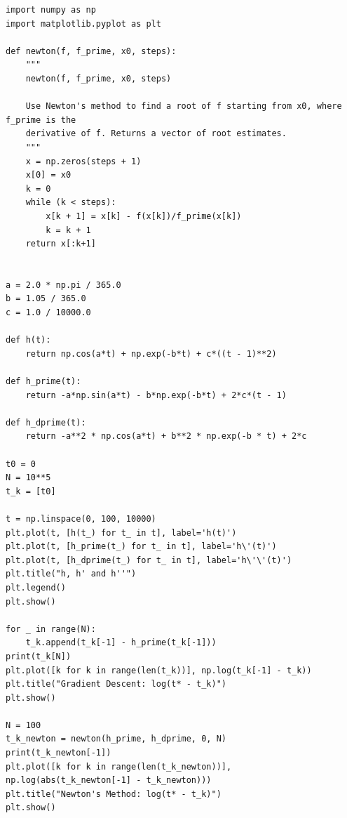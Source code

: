\documentclass[11pt]{article}
\begin{document}
\begin{lstlisting}
import numpy as np
import matplotlib.pyplot as plt

def newton(f, f_prime, x0, steps):
    """
    newton(f, f_prime, x0, steps)

    Use Newton's method to find a root of f starting from x0, where f_prime is the
    derivative of f. Returns a vector of root estimates.
    """
    x = np.zeros(steps + 1)
    x[0] = x0
    k = 0
    while (k < steps):
        x[k + 1] = x[k] - f(x[k])/f_prime(x[k])
        k = k + 1
    return x[:k+1]


a = 2.0 * np.pi / 365.0
b = 1.05 / 365.0
c = 1.0 / 10000.0

def h(t):
    return np.cos(a*t) + np.exp(-b*t) + c*((t - 1)**2)

def h_prime(t):
    return -a*np.sin(a*t) - b*np.exp(-b*t) + 2*c*(t - 1)

def h_dprime(t):
    return -a**2 * np.cos(a*t) + b**2 * np.exp(-b * t) + 2*c

t0 = 0
N = 10**5
t_k = [t0]

t = np.linspace(0, 100, 10000)
plt.plot(t, [h(t_) for t_ in t], label='h(t)')
plt.plot(t, [h_prime(t_) for t_ in t], label='h\'(t)')
plt.plot(t, [h_dprime(t_) for t_ in t], label='h\'\'(t)')
plt.title("h, h' and h''")
plt.legend()
plt.show()

for _ in range(N):
    t_k.append(t_k[-1] - h_prime(t_k[-1]))
print(t_k[N])
plt.plot([k for k in range(len(t_k))], np.log(t_k[-1] - t_k))
plt.title("Gradient Descent: log(t* - t_k)")
plt.show()

N = 100
t_k_newton = newton(h_prime, h_dprime, 0, N)
print(t_k_newton[-1])
plt.plot([k for k in range(len(t_k_newton))], np.log(abs(t_k_newton[-1] - t_k_newton)))
plt.title("Newton's Method: log(t* - t_k)")
plt.show()
\end{lstlisting}
\end{document}
